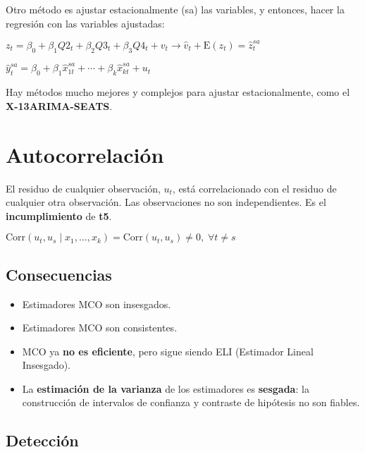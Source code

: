 \documentclass[10pt, a4paper, landscape]{article}
\newcommand{\E}{\mathrm{E}}
\newcommand{\Corr}{\mathrm{Corr}}
\begin{document}
\begin{multicols}{3}
		Otro método es ajustar estacionalmente (sa) las variables, y entonces, hacer la regresión con las variables ajustadas:
		
		\begin{center}
			$z_{t} = \beta_{0} + \beta_{1} Q2_{t} + \beta_{2} Q3_{t} + \beta_{3} Q4_{t} + v_{t} \rightarrow \hat{v}_{t} + \E(z_{t}) = \hat{z}_{t}^{sa}$
			
			$\hat{y}_{t}^{sa}= \beta_{0} + \beta_{1} \hat{x}_{1t}^{sa} + \cdots + \beta_{k} \hat{x}_{kt}^{sa} + u_{t}$
		\end{center}
		
		Hay métodos mucho mejores y complejos para ajustar estacionalmente, como el \textbf{X-13ARIMA-SEATS}.
		
		\columnbreak
		
		\section*{Autocorrelación}
		
		El residuo de cualquier observación, $u_{t}$, está correlacionado con el residuo de cualquier otra observación. Las observaciones no son independientes. Es el \textbf{incumplimiento} de \textbf{t5}.
		
		\begin{center}
			$\Corr(u_{t}, u_{s} \mid x_{1}, \ldots, x_{k}) = \Corr(u_{t}, u_{s}) \neq 0, \; \forall t \neq s$
		\end{center}
		
		\subsection*{Consecuencias}
		
		\begin{itemize}[leftmargin=*]
			\item Estimadores MCO son insesgados.
			\item Estimadores MCO son consistentes.
			\item MCO ya \textbf{no es eficiente}, pero sigue siendo ELI (Estimador Lineal Insesgado).
			\item La \textbf{estimación de la varianza} de los estimadores es \textbf{sesgada}: la construcción de intervalos de confianza y contraste de hipótesis no son fiables.
		\end{itemize}
		
		\subsection*{Detección}
		

\end{multicols}
\end{document}

